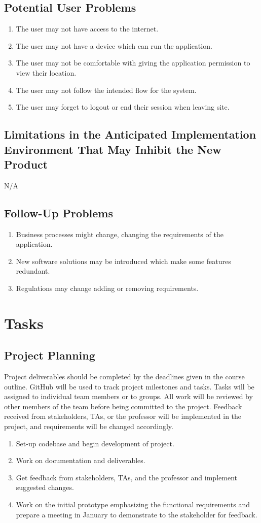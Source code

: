 \documentclass[12pt]{article}
\begin{document}
\subsection{Potential User Problems}
\begin{enumerate}
  \item The user may not have access to the internet.
  \item The user may not have a device which can run the application.
  \item The user may not be comfortable with giving the application
    permission to view their location.
  \item The user may not follow the intended flow for the system.
  \item The user may forget to logout or end their session when leaving site.
\end{enumerate}
\subsection{Limitations in the Anticipated Implementation Environment That May
Inhibit the New Product}
N/A
\subsection{Follow-Up Problems}
\begin{enumerate}
  \item Business processes might change, changing the requirements of
    the application.
  \item New software solutions may be introduced which make some
    features redundant.
  \item Regulations may change adding or removing requirements.
\end{enumerate}

\section{Tasks}
\subsection{Project Planning}
Project deliverables should be completed by the deadlines given in
the course outline. GitHub will be used to track project milestones
and tasks. Tasks will be assigned to individual team members or to
groups. All work will be reviewed by other members of the team before
being committed to the project. Feedback received from stakeholders,
TAs, or the professor will be implemented in the project, and
requirements will be changed accordingly.
\begin{enumerate} [{Task }1.]
  \item Set-up codebase and begin development of project.
  \item Work on documentation and deliverables.
  \item Get feedback from stakeholders, TAs, and the professor and implement
    suggested changes.
  \item Work on the initial prototype emphasizing the functional requirements and prepare a meeting in January
to demonstrate to the stakeholder for feedback.
\end{enumerate}
\end{document}
